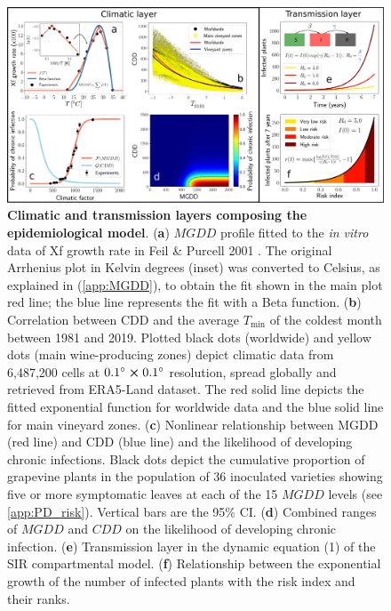 \begin{figure}[t!]
    \centering
    \includegraphics[width=\textwidth]{Figures/Fig1.pdf}
    \caption{\textbf{Climatic and transmission layers composing the
            epidemiological model}. (\textbf{a}) $MGDD$ profile fitted to the
        \textit{in
            vitro } data of Xf growth rate in Feil \& Purcell 2001
        \cite{Feil2001}. The
        original Arrhenius plot in Kelvin degrees (inset) was converted to
        Celsius, as
        explained in (\cref{app:MGDD}), to obtain the fit shown in the
        main
        plot red line; the blue line represents the fit with a Beta function.
        (\textbf{b}) Correlation between CDD and the average $T_{\textrm{min}}$
        of the
        coldest month between 1981 and 2019. Plotted black dots (worldwide) and
        yellow
        dots (main wine-producing zones) depict climatic data from 6,487,200
        cells at
        $\SI{0.1}{\degree} \cross \SI{0.1}{\degree}$ resolution, spread
        globally and
        retrieved from ERA5-Land dataset. The red solid line depicts the fitted
        exponential function for worldwide data and the blue solid line for
        main
        vineyard zones. (\textbf{c}) Nonlinear relationship between MGDD (red
        line) and
        CDD (blue line) and the likelihood of developing chronic infections.
        Black dots
        depict the cumulative proportion of grapevine plants in the population
        of $36$
        inoculated varieties showing five or more symptomatic leaves at each of
        the 15
        $MGDD$ levels (see \cref{app:PD_risk}). Vertical bars are the
        95\% CI.
        (\textbf{d}) Combined ranges of $MGDD$ and $CDD$ on the likelihood of
        developing chronic infection. (\textbf{e}) Transmission layer in the
        dynamic
        equation (1) of the SIR compartmental model. (\textbf{f}) Relationship
        between
        the exponential growth of the number of infected plants with the risk
        index and
        their ranks.}
    \label{fig1}
\end{figure}


